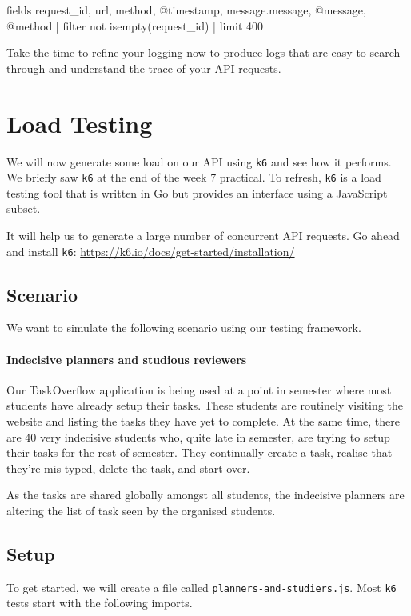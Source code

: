 \documentclass{csse4400}
\begin{document}
\begin{code}[numbers=none]{}
fields request_id, url, method, @timestamp, message.message, @message, @method
| filter not isempty(request_id)
| limit 400
\end{code}

Take the time to refine your logging now to produce logs that are easy to search through and understand the trace of your API requests.


\section{Load Testing}

We will now generate some load on our API using \texttt{k6} and see how it performs.
We briefly saw \texttt{k6} at the end of the week 7 practical.
To refresh, \texttt{k6} is a load testing tool that is written in Go but provides an interface using a JavaScript subset.

It will help us to generate a large number of concurrent API requests.
Go ahead and install \texttt{k6}:
\url{https://k6.io/docs/get-started/installation/}

\subsection{Scenario}
We want to simulate the following scenario using our testing framework.

\paragraph{Indecisive planners and studious reviewers}
Our TaskOverflow application is being used at a point in semester where most students have already setup their tasks.
These students are routinely visiting the website and listing the tasks they have yet to complete.
At the same time, there are 40 very indecisive students who,
quite late in semester,
are trying to setup their tasks for the rest of semester.
They continually create a task,
realise that they're mis-typed,
delete the task,
and start over.

As the tasks are shared globally amongst all students,
the indecisive planners are altering the list of task seen by the organised students.

\subsection{Setup}
To get started,
we will create a file called \texttt{planners-and-studiers.js}.
Most \texttt{k6} tests start with the following imports.
\end{document}
